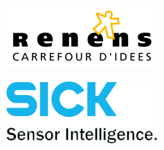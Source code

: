 \begin{figure}[h!]
    \begin{subfigure}[h]{0.15\textheight}
        \includegraphics[width=\textwidth]{images/sponsors/renens}
    \end{subfigure}%
    \hspace{1cm}
    \begin{subfigure}[h]{0.15\textheight}
        \includegraphics[width=\textwidth]{images/sponsors/sick}
    \end{subfigure}
\vspace{0.4cm}



\end{figure}
